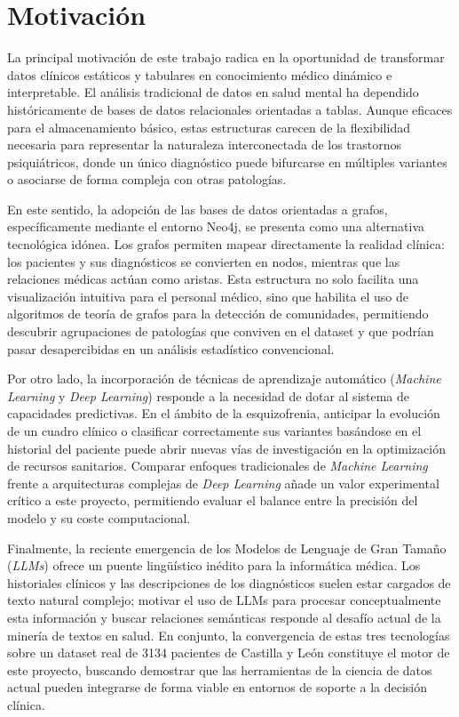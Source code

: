 \documentclass[12pt,a4paper,onecolumn,oneside]{report}
\begin{document}
\section{Motivación}

La principal motivación de este trabajo radica en la oportunidad de transformar datos clínicos estáticos y tabulares en conocimiento médico dinámico e interpretable. El análisis tradicional de datos en salud mental ha dependido históricamente de bases de datos relacionales orientadas a tablas. Aunque eficaces para el almacenamiento básico, estas estructuras carecen de la flexibilidad necesaria para representar la naturaleza interconectada de los trastornos psiquiátricos, donde un único diagnóstico puede bifurcarse en múltiples variantes o asociarse de forma compleja con otras patologías. 

En este sentido, la adopción de las bases de datos orientadas a grafos, específicamente mediante el entorno Neo4j, se presenta como una alternativa tecnológica idónea. Los grafos permiten mapear directamente la realidad clínica: los pacientes y sus diagnósticos se convierten en nodos, mientras que las relaciones médicas actúan como aristas. Esta estructura no solo facilita una visualización intuitiva para el personal médico, sino que habilita el uso de algoritmos de teoría de grafos para la detección de comunidades, permitiendo descubrir agrupaciones de patologías que conviven en el dataset y que podrían pasar desapercibidas en un análisis estadístico convencional.

Por otro lado, la incorporación de técnicas de aprendizaje automático (\textit{Machine Learning} y \textit{Deep Learning}) responde a la necesidad de dotar al sistema de capacidades predictivas. En el ámbito de la esquizofrenia, anticipar la evolución de un cuadro clínico o clasificar correctamente sus variantes basándose en el historial del paciente puede abrir nuevas vías de investigación en la optimización de recursos sanitarios. Comparar enfoques tradicionales de \textit{Machine Learning} frente a arquitecturas complejas de \textit{Deep Learning} añade un valor experimental crítico a este proyecto, permitiendo evaluar el balance entre la precisión del modelo y su coste computacional.

Finalmente, la reciente emergencia de los Modelos de Lenguaje de Gran Tamaño (\textit{LLMs}) ofrece un puente lingüístico inédito para la informática médica. Los historiales clínicos y las descripciones de los diagnósticos suelen estar cargados de texto natural complejo; motivar el uso de LLMs para procesar conceptualmente esta información y buscar relaciones semánticas responde al desafío actual de la minería de textos en salud. En conjunto, la convergencia de estas tres tecnologías sobre un dataset real de 3134 pacientes de Castilla y León constituye el motor de este proyecto, buscando demostrar que las herramientas de la ciencia de datos actual pueden integrarse de forma viable en entornos de soporte a la decisión clínica.
\end{document}
